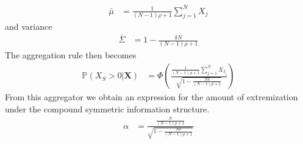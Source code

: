 \documentclass[11pt,twoside]{article}
\renewcommand{\P}{\mathbb{P}}
\begin{document}
\begin{align*}
\bar{\mu} &= \frac{1}{(N-1)\rho +1}  \sum_{j=1}^N X_j 
\end{align*}
and variance 
\begin{align*}
 \bar{\Sigma} &= 1  - \frac{\delta N}{(N-1)\rho +1} 
\end{align*}
The aggregation rule then becomes 
\begin{align*}
\P\left(X_S > 0 \bigg| \boldsymbol{X}\right) &=\Phi\left(\frac{\frac{1}{(N-1)\rho +1} \sum_{j=1}^N X_{I_j} }{\sqrt{1- \frac{N\delta}{(N-1)\rho +1} }}  \right)
\end{align*}
From this aggregator we obtain an expression for the amount of extremization under the compound symmetric information structure.
\begin{align}
\alpha &= \frac{\frac{N}{(N-1)\rho +1}}{\sqrt{1- \frac{N\delta}{(N-1)\rho +1} }} \label{CompoundAlpha}
\end{align}
\end{document}
